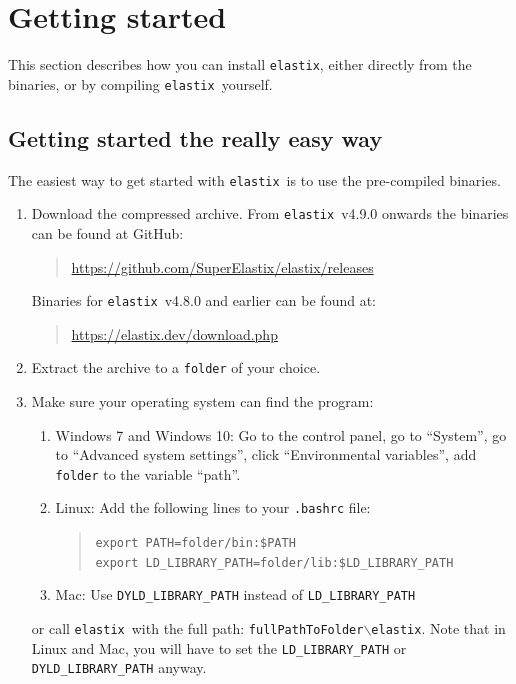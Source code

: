 \documentclass[]{report}
\newcommand{\elastix}{\texttt{elastix}}
\begin{document}
\section{Getting started}\label{sec:elastix:install}

This section describes how you can install \elastix, either directly
from the binaries, or by compiling \elastix\ yourself.

\subsection{Getting started the really easy way}

The easiest way to get started with \elastix\ is to use the
pre-compiled binaries.
\begin{enumerate}
\item Download the compressed archive. From \elastix\ v4.9.0 onwards
the binaries can be found at GitHub:
    \begin{quote}
    \url{https://github.com/SuperElastix/elastix/releases}
    \end{quote}

Binaries for \elastix\ v4.8.0 and earlier can be found at:
    \begin{quote}
    \url{https://elastix.dev/download.php}
    \end{quote}

\item Extract the archive to a \texttt{folder} of your choice.

\item Make sure your operating system can find the program:
    \begin{enumerate}
    \item Windows 7 and Windows 10: Go to the control panel, go to ``System'', go to
    ``Advanced system settings'', click ``Environmental variables'',
    add \texttt{folder} to the variable ``path''.

    \item Linux: Add the following lines to your \texttt{.bashrc} file:
       \begin{quote}
       \texttt{export PATH=folder/bin:\$PATH}\\
       \texttt{export LD\_LIBRARY\_PATH=folder/lib:\$LD\_LIBRARY\_PATH}
       \end{quote}

    \item Mac: Use \texttt{DYLD\_LIBRARY\_PATH} instead of \texttt{LD\_LIBRARY\_PATH}

    \end{enumerate}
    or call \elastix\ with the full path:
    \texttt{fullPathToFolder$\backslash$elastix}. Note that in Linux and Mac, you
    will have to set the \texttt{LD\_LIBRARY\_PATH} or \texttt{DYLD\_LIBRARY\_PATH} anyway.
\end{enumerate}
\end{document}
